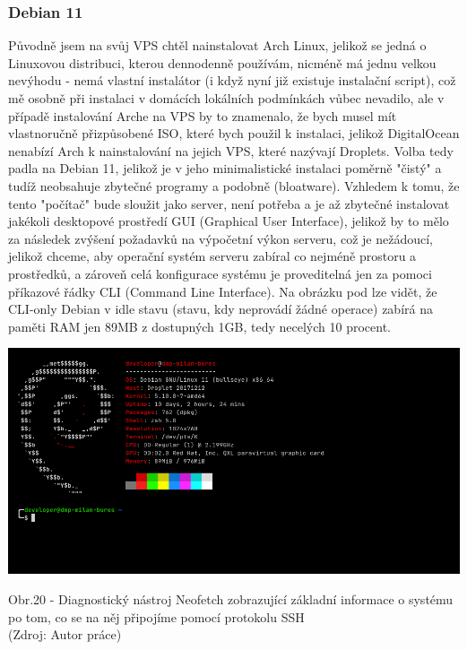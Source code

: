 \documentclass[12pt,a4paper]{report}
\begin{document}
  \subsubsection{Debian 11}
  Původně jsem na svůj VPS chtěl nainstalovat Arch Linux, jelikož se jedná o Linuxovou distribuci, kterou dennodenně používám, nicméně má jednu velkou
  nevýhodu - nemá vlastní instalátor (i když nyní již existuje instalační script), což mě osobně při
  instalaci v domácích lokálních podmínkách vůbec nevadilo, ale v případě instalování Arche na VPS
  by to znamenalo, že bych musel mít vlastnoručně přizpůsobené ISO, které bych použil k instalaci,
  jelikož DigitalOcean nenabízí Arch k nainstalování na jejich VPS, které nazývají Droplets.
  Volba tedy padla na Debian 11, jelikož je v jeho minimalistické instalaci poměrně "čistý" \space a tudíž
  neobsahuje zbytečné programy a podobně (bloatware). Vzhledem k tomu, že tento "počítač" \space bude
  sloužit jako server, není potřeba a je až zbytečné instalovat jakékoli desktopové prostředí GUI
  (Graphical User Interface), jelikož by to mělo za následek zvýšení požadavků na výpočetní
  výkon serveru, což je nežádoucí, jelikož chceme, aby operační systém serveru zabíral co nejméně
  prostoru a prostředků, a zároveň celá konfigurace systému je proveditelná jen za pomoci
  příkazové řádky CLI (Command Line Interface). Na obrázku pod lze vidět, že CLI-only Debian v idle
  stavu (stavu, kdy neprovádí žádné operace) zabírá na paměti RAM jen 89MB z dostupných 1GB,
  tedy necelých 10 procent.

  \vspace*{0.5cm}
  \noindent\includegraphics[width=\linewidth]{VPS.png}
  \begin{center}
    Obr.20 -  Diagnostický nástroj Neofetch zobrazující základní informace o systému po tom, co se na něj připojíme pomocí protokolu SSH  \\
    (Zdroj: Autor práce)
  \end{center}
  \vspace*{0.5cm}
\end{document}
